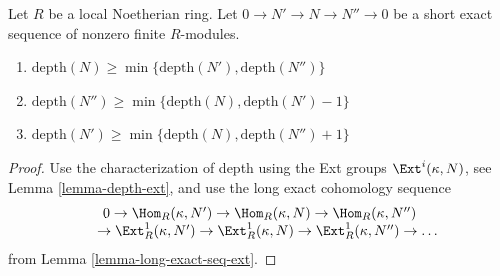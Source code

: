 \begin{lemma}
\label{lemma-depth-in-ses}
Let $R$ be a local Noetherian ring. Let $0 \to N' \to N \to N'' \to 0$
be a short exact sequence of nonzero finite $R$-modules.
\begin{enumerate}
\item
$\text{depth}(N) \geq \min\{\text{depth}(N'), \text{depth}(N'')\}$
\item
$\text{depth}(N'') \geq \min\{\text{depth}(N), \text{depth}(N') - 1\}$
\item
$\text{depth}(N') \geq \min\{\text{depth}(N), \text{depth}(N'') + 1\}$
\end{enumerate}
\end{lemma}

\begin{proof}
Use the characterization of depth using the Ext groups
$\Ext^i(\kappa, N)$, see Lemma \ref{lemma-depth-ext},
and use the long exact cohomology sequence
$$
\begin{matrix}
0
\to \Hom_R(\kappa, N')
\to \Hom_R(\kappa, N)
\to \Hom_R(\kappa, N'')
\\
\phantom{0\ }
\to \Ext^1_R(\kappa, N')
\to \Ext^1_R(\kappa, N)
\to \Ext^1_R(\kappa, N'')
\to \ldots
\end{matrix}
$$
from Lemma \ref{lemma-long-exact-seq-ext}.
\end{proof}
